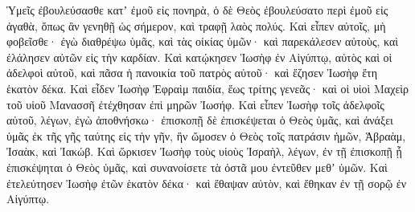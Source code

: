 {Ὑμεῖς ἐβουλεύσασθε κατʼ ἐμοῦ εἰς πονηρὰ, ὁ δὲ Θεὸς ἐβουλεύσατο περὶ ἐμοῦ εἰς ἀγαθὰ, ὅπως ἂν γενηθῇ ὡς σήμερον, καὶ τραφῇ λαὸς πολύς.
Καὶ εἶπεν αὐτοῖς, μὴ φοβεῖσθε· ἐγὼ διαθρέψω ὑμᾶς, καὶ τὰς οἰκίας ὑμῶν· καὶ παρεκάλεσεν αὐτοὺς, καὶ ἐλάλησεν αὐτῶν εἰς τὴν καρδίαν.
Καὶ κατῴκησεν Ἰωσὴφ ἐν Αἰγύπτῳ, αὐτὸς καὶ οἱ ἀδελφοὶ αὐτοῦ, καὶ πᾶσα ἡ πανοικία τοῦ πατρὸς αὐτοῦ· καὶ ἔζησεν Ἰωσὴφ ἔτη ἑκατὸν δέκα.
Καὶ εἶδεν Ἰωσὴφ Ἐφραὶμ παιδία, ἕως τρίτης γενεᾶς· καὶ οἱ υἱοὶ Μαχεὶρ τοῦ υἱοῦ Μανασσῆ ἐτέχθησαν ἐπὶ μηρῶν Ἰωσήφ.
Καὶ εἶπεν Ἰωσὴφ τοῖς ἀδελφοῖς αὐτοῦ, λέγων, ἐγὼ ἀποθνήσκω· ἐπισκοπῇ δὲ ἐπισκέψεται ὁ Θεὸς ὑμᾶς, καὶ ἀνάξει ὑμᾶς ἐκ τῆς γῆς ταύτης εἰς τὴν γῆν, ἣν ὤμοσεν ὁ Θεὸς τοῖς πατράσιν ἡμῶν, Ἁβραὰμ, Ἰσαὰκ, καὶ Ἰακώβ.
Καὶ ὥρκισεν Ἰωσὴφ τοὺς υἱοὺς Ἰσραὴλ, λέγων, ἐν τῇ ἐπισκοπῇ ᾗ ἐπισκέψηται ὁ Θεὸς ὑμᾶς, καὶ συνανοίσετε τὰ ὀστᾶ μου ἐντεῦθεν μεθʼ ὑμῶν.
Καὶ ἐτελεύτησεν Ἰωσὴφ ἐτῶν ἑκατὸν δέκα· καὶ ἔθαψαν αὐτὸν, καὶ ἔθηκαν ἐν τῇ σορῷ ἐν Αἰγύπτῳ.
\par }